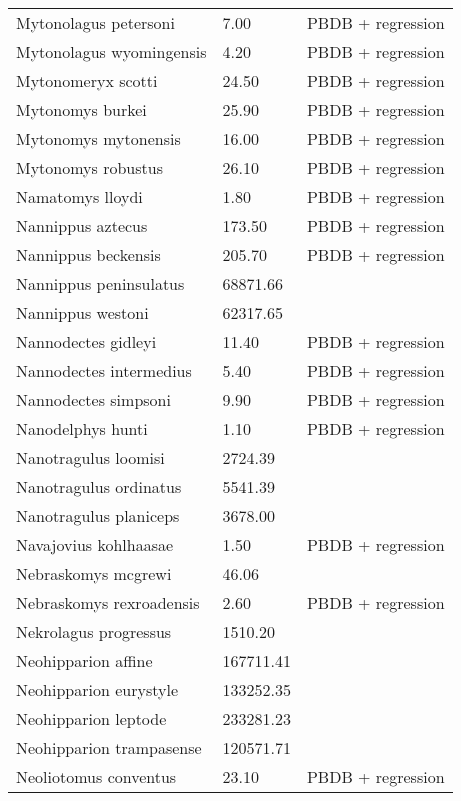 \documentclass{article}
\begin{document}
\begin{center}
\begin{longtable}{p{} p{} p{}}
    Mytonolagus petersoni & 7.00 & PBDB + regression \\ 
    Mytonolagus wyomingensis & 4.20 & PBDB + regression \\ 
    Mytonomeryx scotti & 24.50 & PBDB + regression \\ 
    Mytonomys burkei & 25.90 & PBDB + regression \\ 
    Mytonomys mytonensis & 16.00 & PBDB + regression \\ 
    Mytonomys robustus & 26.10 & PBDB + regression \\ 
    Namatomys lloydi & 1.80 & PBDB + regression \\ 
    Nannippus aztecus & 173.50 & PBDB + regression \\ 
    Nannippus beckensis & 205.70 & PBDB + regression \\ 
    Nannippus peninsulatus & 68871.66 & \cite{Tomiya2013} \\ 
    Nannippus westoni & 62317.65 & \cite{Tomiya2013} \\ 
    Nannodectes gidleyi & 11.40 & PBDB + regression \\ 
    Nannodectes intermedius & 5.40 & PBDB + regression \\ 
    Nannodectes simpsoni & 9.90 & PBDB + regression \\ 
    Nanodelphys hunti & 1.10 & PBDB + regression \\ 
    Nanotragulus loomisi & 2724.39 & \cite{Tomiya2013} \\ 
    Nanotragulus ordinatus & 5541.39 & \cite{Tomiya2013} \\ 
    Nanotragulus planiceps & 3678.00 & \cite{McKenna2011} \\ 
    Navajovius kohlhaasae & 1.50 & PBDB + regression \\ 
    Nebraskomys mcgrewi & 46.06 & \cite{Tomiya2013} \\ 
    Nebraskomys rexroadensis & 2.60 & PBDB + regression \\ 
    Nekrolagus progressus & 1510.20 & \cite{Tomiya2013} \\ 
    Neohipparion affine & 167711.41 & \cite{Tomiya2013} \\ 
    Neohipparion eurystyle & 133252.35 & \cite{Tomiya2013} \\ 
    Neohipparion leptode & 233281.23 & \cite{Tomiya2013} \\ 
    Neohipparion trampasense & 120571.71 & \cite{Tomiya2013} \\ 
    Neoliotomus conventus & 23.10 & PBDB + regression \\ 

\end{longtable}
\end{center}
\end{document}
